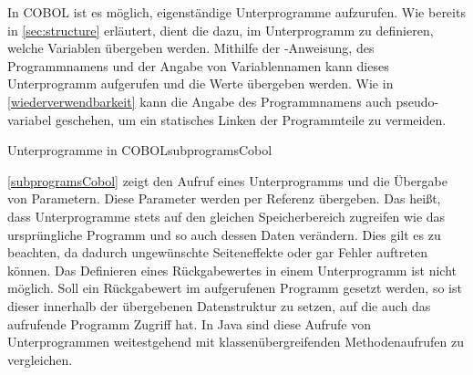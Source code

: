 In COBOL ist es möglich, eigenständige Unterprogramme aufzurufen. Wie bereits in \autoref{sec:structure} erläutert, dient die  dazu, im Unterprogramm zu definieren, welche Variablen übergeben werden. Mithilfe der -Anweisung, des Programmnamens und der Angabe von Variablennamen kann dieses Unterprogramm aufgerufen und die Werte übergeben werden. Wie in \autoref{wiederverwendbarkeit} kann die Angabe des Programmnamens auch pseudo-variabel geschehen, um ein statisches Linken der Programmteile zu vermeiden. 

\begin{codeWithCaption}{Unterprogramme in COBOL}{subprogramsCobol}
\end{codeWithCaption}

\autoref{subprogramsCobol} zeigt den Aufruf eines Unterprogramms und die Übergabe von Parametern. Diese Parameter werden per Referenz übergeben. Das heißt, dass Unterprogramme stets auf den gleichen Speicherbereich zugreifen wie das ursprüngliche Programm und so auch dessen Daten verändern. Dies gilt es zu beachten, da dadurch ungewünschte Seiteneffekte oder gar Fehler auftreten können. Das Definieren eines Rückgabewertes in einem Unterprogramm ist nicht möglich. Soll ein Rückgabewert im aufgerufenen Programm gesetzt werden, so ist dieser innerhalb der übergebenen Datenstruktur zu setzen, auf die auch das aufrufende Programm Zugriff hat. In Java sind diese Aufrufe von Unterprogrammen weitestgehend mit klassenübergreifenden Methodenaufrufen zu vergleichen.